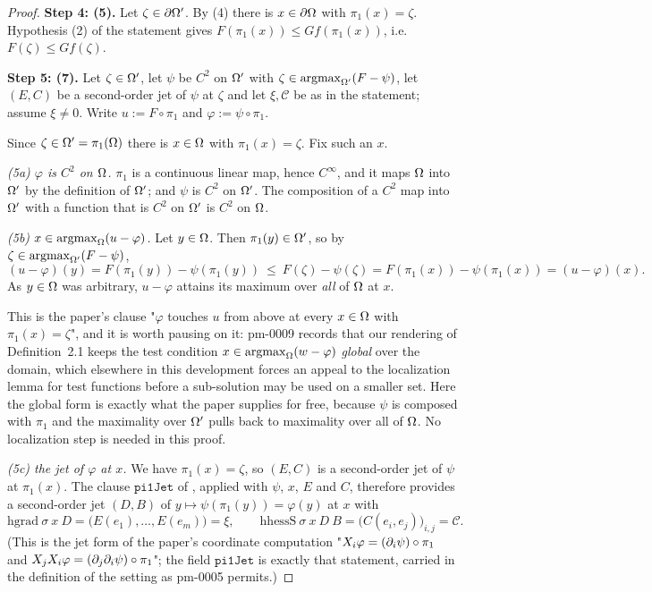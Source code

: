 \begin{proof}
\medskip\noindent\textbf{Step 4: (5).} Let $\zeta\in\partial\Omega'$. By (4) there is
$x\in\partial\Omega$ with $\pi_1(x)=\zeta$. Hypothesis (2) of the statement gives
$F(\pi_1(x))\le Gf(\pi_1(x))$, i.e. $F(\zeta)\le Gf(\zeta)$.

\medskip\noindent\textbf{Step 5: (7).} Let $\zeta\in\Omega'$, let $\psi$ be $C^{2}$ on $\Omega'$
with $\zeta\in\operatorname*{argmax}_{\Omega'}(F-\psi)$, let $(E,C)$ be a second-order jet of $\psi$ at $\zeta$
and let $\xi,\mathcal C$ be as in the statement; assume $\xi\ne0$. Write
$u:=F\circ\pi_1$ and $\varphi:=\psi\circ\pi_1$.

Since $\zeta\in\Omega'=\pi_1(\Omega)$ there is $x\in\Omega$ with $\pi_1(x)=\zeta$. Fix such an $x$.

\emph{(5a) $\varphi$ is $C^{2}$ on $\Omega$.} $\pi_1$ is a continuous linear map, hence
$C^{\infty}$, and it maps $\Omega$ into $\Omega'$ by the definition of $\Omega'$; and $\psi$ is
$C^{2}$ on $\Omega'$. The composition of a $C^{2}$ map into $\Omega'$ with a function that is
$C^{2}$ on $\Omega'$ is $C^{2}$ on $\Omega$.

\emph{(5b) $x\in\operatorname*{argmax}_\Omega(u-\varphi)$.} Let $y\in\Omega$. Then $\pi_1(y)\in\Omega'$, so by
$\zeta\in\operatorname*{argmax}_{\Omega'}(F-\psi)$,
\[
 (u-\varphi)(y)=F(\pi_1(y))-\psi(\pi_1(y))\ \le\ F(\zeta)-\psi(\zeta)
 =F(\pi_1(x))-\psi(\pi_1(x))=(u-\varphi)(x).
\]
As $y\in\Omega$ was arbitrary, $u-\varphi$ attains its maximum over \emph{all} of $\Omega$ at $x$.

This is the paper's clause "$\varphi$ touches $u$ from above at every $x\in\Omega$ with
$\pi_1(x)=\zeta$", and it is worth pausing on it: pm-0009 records that our rendering of
Definition~2.1 keeps the test condition $x\in\operatorname*{argmax}_\Omega(w-\varphi)$ \emph{global} over the domain,
which elsewhere in this development forces an appeal to the localization lemma for test
functions before a sub-solution may be used on a smaller set. Here the
global form is exactly what the paper supplies for free, because $\psi$ is composed with
$\pi_1$ and the maximality over $\Omega'$ pulls back to maximality over all of $\Omega$. No
localization step is needed in this proof.

\emph{(5c) the jet of $\varphi$ at $x$.} We have $\pi_1(x)=\zeta$, so $(E,C)$ is a
second-order jet of $\psi$ at $\pi_1(x)$. The clause $\mathtt{pi1Jet}$ of
, applied with $\psi$, $x$, $E$ and $C$, therefore provides a
second-order jet $(D,B)$ of $y\mapsto\psi(\pi_1(y))=\varphi(y)$ at $x$ with
\[
 \mathrm{hgrad}\ \sigma\ x\ D=\big(E(e_1),\ldots,E(e_m)\big)=\xi,\qquad
 \mathrm{hhessS}\ \sigma\ x\ D\ B=\big(C(e_i,e_j)\big)_{i,j}=\mathcal C . \tag{$\ast$}
\]
(This is the jet form of the paper's coordinate computation
"$X_i\varphi=(\partial_i\psi)\circ\pi_1$ and $X_jX_i\varphi=(\partial_j\partial_i\psi)\circ\pi_1$"; the
field $\mathtt{pi1Jet}$ is exactly that statement, carried in the definition of the setting as
pm-0005 permits.)


\end{proof}
